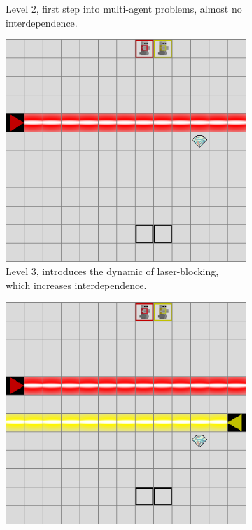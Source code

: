 \begin{figure}[h]
\begin{subfigure}[t]{0.31\linewidth}
        \caption{Level 2, first step into multi-agent problems, almost no interdependence.}
    \end{subfigure}
    \hfill
    \begin{subfigure}[t]{0.31\linewidth}
        \includegraphics[width=\linewidth]{images/envs/lvl3.png}
        \caption{Level 3, introduces the dynamic of laser-blocking, which increases interdependence.}
    \end{subfigure}
    \begin{subfigure}[t]{0.31\linewidth}
        \includegraphics[width=\linewidth]{images/envs/lvl4.png}

\end{subfigure}
\end{figure}

